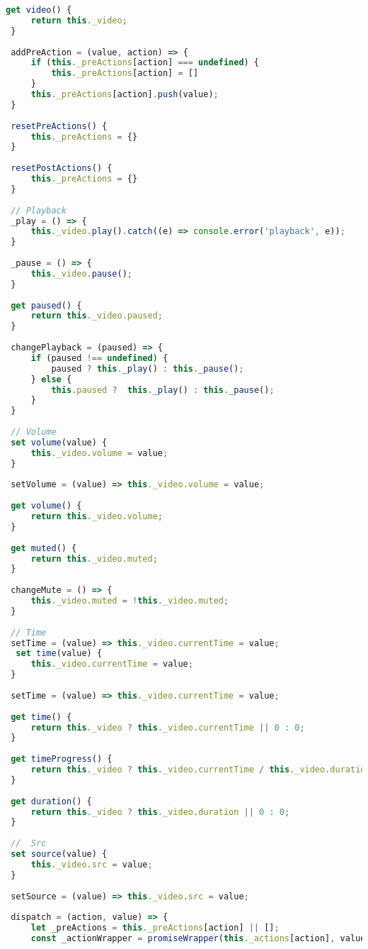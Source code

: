 \begin{lstlisting}[language=JavaScript,label={lst:add:player}]
 get video() {
     return this._video;
 }
 
 addPreAction = (value, action) => {
     if (this._preActions[action] === undefined) {
         this._preActions[action] = []
     }
     this._preActions[action].push(value);
 }
 
 resetPreActions() {
     this._preActions = {}
 }
 
 resetPostActions() {
     this._preActions = {}
 }
 
 // Playback
 _play = () => {
     this._video.play().catch((e) => console.error('playback', e));
 }
 
 _pause = () => {
     this._video.pause();
 }
 
 get paused() {
     return this._video.paused;
 }
 
 changePlayback = (paused) => {
     if (paused !== undefined) {
         paused ? this._play() : this._pause();
     } else {
         this.paused ?  this._play() : this._pause();
     }
 }
 
 // Volume
 set volume(value) {
     this._video.volume = value;
 }
 
 setVolume = (value) => this._video.volume = value;
 
 get volume() {
     return this._video.volume;
 }
 
 get muted() {
     return this._video.muted;
 }
 
 changeMute = () => {
     this._video.muted = !this._video.muted;
 }
 
 // Time
 setTime = (value) => this._video.currentTime = value;
  set time(value) {
     this._video.currentTime = value;
 }
 
 setTime = (value) => this._video.currentTime = value;
 
 get time() {
     return this._video ? this._video.currentTime || 0 : 0;
 }
 
 get timeProgress() {
     return this._video ? this._video.currentTime / this._video.duration || 0 : 0;
 }
 
 get duration() {
     return this._video ? this._video.duration || 0 : 0;
 }
 
 //  Src
 set source(value) {
     this._video.src = value;
 }
 
 setSource = (value) => this._video.src = value;
 
 dispatch = (action, value) => {
     let _preActions = this._preActions[action] || [];
     const _actionWrapper = promiseWrapper(this._actions[action], value);
 

\end{lstlisting}
